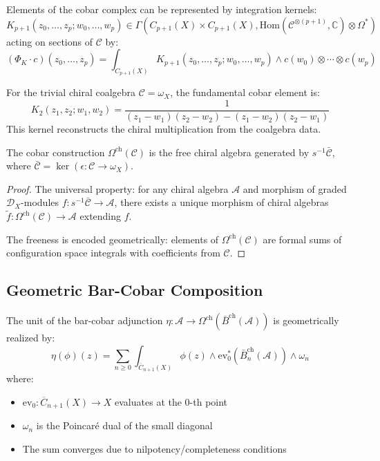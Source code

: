 \begin{definition}\label{def:cobar-kernel}
Elements of the cobar complex can be represented by integration kernels:
\[
K_{p+1}(z_0, \ldots, z_p; w_0, \ldots, w_p) \in \Gamma\left(C_{p+1}(X) \times C_{p+1}(X), \text{Hom}(\mathcal{C}^{\otimes(p+1)}, \mathbb{C}) \otimes \Omega^*\right)
\]
acting on sections of $\mathcal{C}$ by:
\[
(\Phi_K \cdot c)(z_0, \ldots, z_p) = \int_{C_{p+1}(X)} K_{p+1}(z_0, \ldots, z_p; w_0, \ldots, w_p) \wedge c(w_0) \otimes \cdots \otimes c(w_p)
\]
\end{definition}

\begin{example}\label{ex:fundamental-cobar}
For the trivial chiral coalgebra $\mathcal{C} = \omega_X$, the fundamental cobar element is:
\[
K_2(z_1, z_2; w_1, w_2) = \frac{1}{(z_1 - w_1)(z_2 - w_2) - (z_1 - w_2)(z_2 - w_1)}
\]
This kernel reconstructs the chiral multiplication from the coalgebra data.
\end{example}

\begin{theorem}\label{thm:cobar-free}
The cobar construction $\Omega^{\text{ch}}(\mathcal{C})$ is the free chiral algebra generated by $s^{-1}\bar{\mathcal{C}}$, where $\bar{\mathcal{C}} = \ker(\epsilon: \mathcal{C} \to \omega_X)$.
\end{theorem}

\begin{proof}
The universal property: for any chiral algebra $\mathcal{A}$ and morphism of graded $\mathcal{D}_X$-modules $f: s^{-1}\bar{\mathcal{C}} \to \mathcal{A}$, there exists a unique morphism of chiral algebras $\tilde{f}: \Omega^{\text{ch}}(\mathcal{C}) \to \mathcal{A}$ extending $f$.

The freeness is encoded geometrically: elements of $\Omega^{\text{ch}}(\mathcal{C})$ are formal sums of configuration space integrals with coefficients from $\mathcal{C}$.
\end{proof}

\subsection{Geometric Bar-Cobar Composition}

\begin{theorem}\label{thm:geom-unit}
The unit of the bar-cobar adjunction $\eta: \mathcal{A} \to \Omega^{\text{ch}}(\bar{B}^{\text{ch}}(\mathcal{A}))$ is geometrically realized by:
\[
\eta(\phi)(z) = \sum_{n \geq 0} \int_{\overline{C}_{n+1}(X)} \phi(z) \wedge \text{ev}^*_{0}\left(\bar{B}_n^{\text{ch}}(\mathcal{A})\right) \wedge \omega_n
\]
where:
\begin{itemize}
\item $\text{ev}_0: \overline{C}_{n+1}(X) \to X$ evaluates at the 0-th point
\item $\omega_n$ is the Poincaré dual of the small diagonal
\item The sum converges due to nilpotency/completeness conditions
\end{itemize}
\end{theorem}

